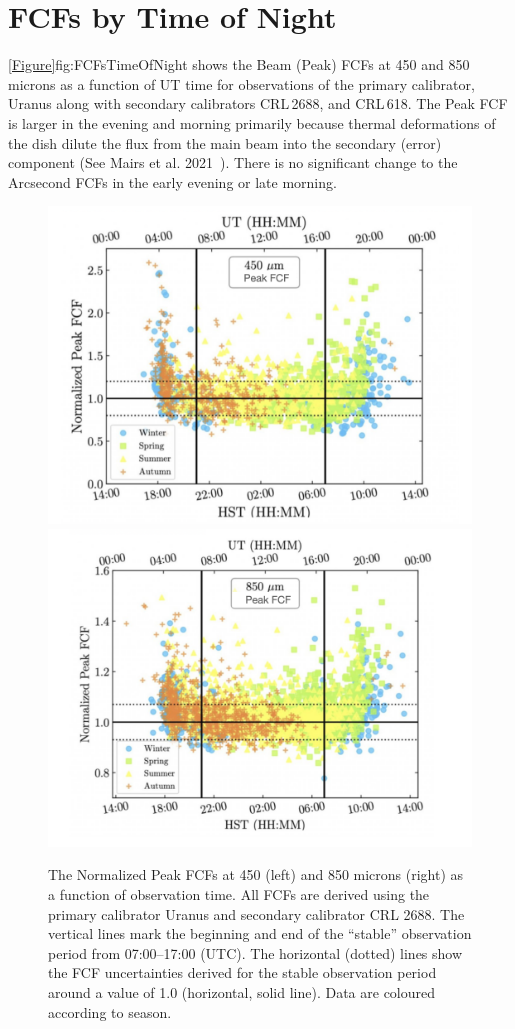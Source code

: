 \chapter{FCFs by Time of Night}
\label{app:fcfstime}

\cref{Figure}{fig:FCFsTimeOfNight}{} shows the Beam (Peak) FCFs at
450 and 850\,microns as a function of UT time for observations of the
primary calibrator, Uranus along with secondary calibrators CRL\,2688, and CRL\,618.
The Peak FCF is larger in the evening and morning primarily because thermal
deformations of the dish dilute the flux from the main beam into the secondary
(error) component (See Mairs et al. 2021~\cite{mairs21}). There is no significant
change to the Arcsecond FCFs in the early evening or late morning.

\begin{figure}
\begin{center}
\includegraphics[width=0.47\linewidth]{sc21-FCFsTimeOfNight-450} \hspace{0.02\linewidth}
\includegraphics[width=0.47\linewidth]{sc21-FCFsTimeOfNight-850}
\caption[FCFs Time of Night]{The Normalized Peak FCFs at 450 (left) and 850 microns (right)
as a function of observation time. All FCFs are derived using the primary calibrator Uranus and
secondary calibrator CRL 2688. The vertical lines mark the beginning and end of the “stable” observation
period from 07:00–17:00 (UTC). The horizontal (dotted) lines show the FCF uncertainties derived for the
stable observation period around a value of 1.0 (horizontal, solid line).
Data are coloured according to season. \label{fig:FCFsTimeOfNight}}
\end{center}
\end{figure}

